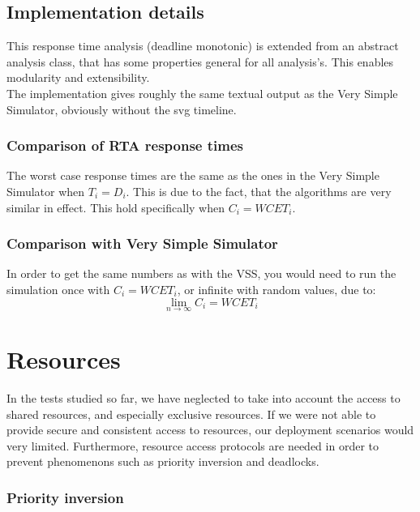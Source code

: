 \documentclass{acm_proc_article-sp}
\begin{document}
\subsection{Implementation details}
This response time analysis (deadline monotonic) is extended from an abstract analysis class, that has some properties general for all analysis's. This enables modularity and extensibility.\\
The implementation gives roughly the same textual output as the Very Simple Simulator, obviously without the svg timeline.
\subsubsection{Comparison of RTA response times}
The worst case response times are the same as the ones in the Very Simple Simulator when $T_i = D_i$.
This is due to the fact, that the algorithms are very similar in effect. This hold specifically when $C_i=WCET_i $.

\subsubsection{Comparison with Very Simple Simulator}
In order to get the same numbers as with the VSS, you would need to run the simulation once with $C_i=WCET_i$, or infinite with random values, due to:
\begin{equation}
\underset{n\rightarrow \infty }{\lim}C_i=WCET_i\end{equation}



\section{Resources}
In the tests studied so far, we have neglected to take into account the access to shared resources, and especially exclusive resources. If we were not able to provide secure and consistent access to resources, our deployment scenarios would very limited. Furthermore, resource access protocols are needed in order to prevent phenomenons such as priority inversion and deadlocks.
\subsubsection{Priority inversion}
\end{document}
